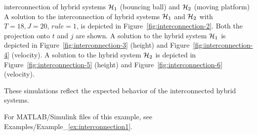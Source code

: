 \begin{example}{interconnection of hybrid systems $\mathcal{H}_1$ (bouncing ball) and $\mathcal{H}_2$ (moving platform)}
A solution to the interconnection of hybrid systems $\mathcal{H}_1$ and
$\mathcal{H}_2$ with $T=18, J=20$, $rule =1$, is depicted in Figure~\ref{fig:interconnection-2}.
Both the projection onto $t$ and $j$ are shown. A solution to the hybrid system $\mathcal{H}_1$ is
depicted in Figure~\ref{fig:interconnection-3} (height) and Figure~\ref{fig:interconnection-4}
(velocity). A solution to the hybrid system $\mathcal{H}_2$ is depicted in
Figure~\ref{fig:interconnection-5} (height) and Figure~\ref{fig:interconnection-6} (velocity).

These simulations reflect the expected behavior of the interconnected hybrid systems. %

For MATLAB/Simulink files of this example, see Examples/Example\_\ref{ex:interconnection1}.

\end{example}

